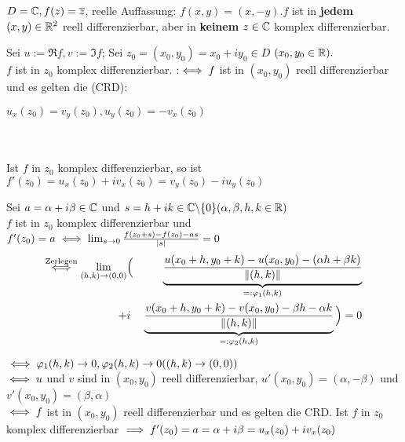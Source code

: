 \documentclass{article}
\def\gdw{\equizu}
\begin{document}
\begin{beispiel}
$D = \mathbb{C}, f(z) = \overline{z}$, reelle Auffassung: $f(x,y) = (x, -y). f$ ist in \textbf{jedem} $(x,y) \in \mathbb{R} ^2$ reell differenzierbar, aber in \textbf{keinem} $z \in \mathbb{C}$ komplex differenzierbar.
\end{beispiel}

\begin{satz}
Sei $u:=\Re f, v:=\Im f$; Sei $z_0 = (x_0,y_0) = x_0 + iy_0 \in D $ $(x_0,y_0 \in \mathbb{R}).$ \\ $ f$ ist in $z_0$ komplex differenzierbar. $:\gdw f$ ist in $(x_0,y_0)$ reell differenzierbar und es gelten die  (CRD): \\
\centerline{$u_x(z_0) = v_y(z_0), u_y(z_0) = -v_x(z_0)$} \\ \\
Ist $f$ in $z_0$ komplex differenzierbar, so ist $f'(z_0) = u_x(z_0) + iv_x(z_0) = v_y(z_0) - iu_y(z_0)$
\end{satz}

\begin{beweis}
Sei $ a = \alpha + i\beta \in \mathbb{C}$ und $s = h + ik \in \mathbb{C} \backslash\{0\} (\alpha ,\beta ,h,k \in \mathbb{R} )$ \\
$f$ ist in $z_0$ komplex differenzierbar und $f'(z_0) = a \gdw \lim_{s \rightarrow 0} \frac{f(z_0 + s) - f(z_0) - as}{|s|} = 0$ \\
\begin{eqnarray}\notag \stackrel{\text{Zerlegen}}{\gdw} \lim_{(h,k) \rightarrow (0,0)} & \Big( &\underbrace{\frac{u(x_0+h,y_0+k) - u(x_0,y_0) - (\alpha h+\beta k)}{\|(h,k)\|}}_{=:\varphi _1(h,k)} \\ 
\notag + & i &\underbrace{\frac{v(x_0+h,y_0+k) - v(x_0,y_0) - \beta h - \alpha k}{\|(h,k)\|}}_{=:\varphi _2(h,k)}\Big) = 0
\end{eqnarray}

$\gdw \varphi _1 (h,k) \rightarrow 0, \varphi _2 (h,k) \rightarrow 0 ((h,k) \rightarrow (0,0))$ \\
$\gdw u$ und $v$ sind in $(x_0,y_0)$ reell differenzierbar, $u'(x_0,y_0) = (\alpha , -\beta)$ und $v'(x_0,y_0) = (\beta ,\alpha)$ \\
$\gdw f$ ist in $(x_0,y_0)$ reell differenzierbar und es gelten die CRD. Ist $f$ in $z_0$ komplex differenzierbar $\implies f'(z_0) = a = \alpha + i\beta = u_x(z_0) + iv_x(z_0)$
\end{beweis}
\end{document}
